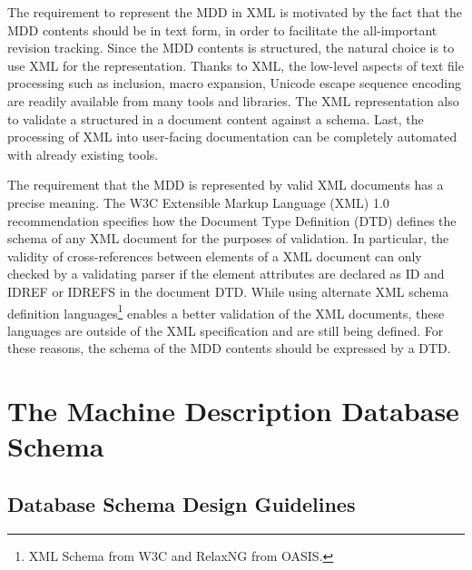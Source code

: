 \documentclass[11pt,a4paper]{article}
\begin{document}
The requirement to represent the MDD in XML is motivated by the fact that the
MDD contents should be in text form, in order to facilitate the all-important
revision tracking.  Since the MDD contents is structured, the natural choice is
to use XML for the representation. Thanks to XML, the low-level aspects of text
file processing such as inclusion, macro expansion, Unicode escape sequence
encoding are readily available from many tools and libraries. The XML
representation also to validate a structured in a document content against a
schema. Last, the processing of XML into user-facing documentation can be
completely automated with already existing tools. \medskip

The requirement that the MDD is represented by valid XML documents has a precise
meaning. The W3C Extensible Markup Language (XML) 1.0 recommendation specifies
how the Document Type Definition (DTD) defines the schema of any XML document
for the purposes of validation. In particular, the validity of cross-references
between elements of a XML document can only checked by a validating parser if
the element attributes are declared as ID and IDREF or IDREFS in the document
DTD. While using alternate XML schema definition languages\footnote{XML Schema
from W3C and RelaxNG from OASIS.} enables a better validation of the XML
documents, these languages are outside of the XML specification and are still
being defined. For these reasons, the schema of the MDD contents should be
expressed by a DTD.

\section{The Machine Description Database Schema}

\subsection{Database Schema Design Guidelines}
\end{document}
